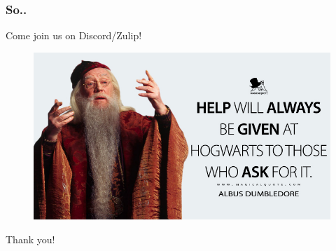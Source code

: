 \documentclass{beamer}
\begin{document}
\begin{frame}
\frametitle{So..}
Come join us on Discord/Zulip! \pause
\begin{figure}
  \includegraphics[width = \linewidth]{dumbledore-quote.jpg}
\end{figure}
\end{frame}

\begin{frame}
Thank you!
\end{frame}
\end{document}
